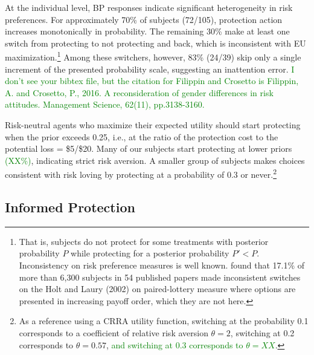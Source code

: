 \documentclass[12pt,a4paper]{article}
\begin{document}
At the individual level, BP responses indicate significant heterogeneity in risk preferences. For approximately 70\% of subjects (72/105), protection action increases monotonically in probability. The remaining 30\% make at least one switch from protecting to not protecting and back, which is inconsistent with EU maximization.\footnote{That is, subjects do not protect for some treatments with posterior probability $P$ while protecting for a posterior probability $P'<P$.  Inconsistency on risk preference measures is well known.  \citet{filippin_and_crosetto} found that 17.1\% of more than 6,300 subjects in 54 published papers made inconsistent switches on the Holt and Laury (2002) on paired-lottery measure where options are presented in increasing payoff order, which they are not here.} Among these switchers, however, 83\% (24/39) skip only a single increment of the presented probability scale, suggesting an inattention error. 
\textcolor{green}{I don't see your bibtex file, but the citation for Filippin and Crosetto is Filippin, A. and Crosetto, P., 2016. A reconsideration of gender differences in risk attitudes. Management Science, 62(11), pp.3138-3160.}


Risk-neutral agents who maximize their expected utility should start protecting when the prior exceeds 0.25, i.e., at the ratio of the protection cost to the potential loss = \$5/\$20. Many of our subjects start protecting at lower priors \textcolor{green}{(XX\%)}, indicating strict risk aversion.  A smaller group of subjects makes choices consistent with risk loving by protecting at a probability of 0.3 or never.\footnote{As a reference using a CRRA utility function, switching at the probability 0.1 corresponds to a coefficient of relative risk aversion $\theta=2$, switching at 0.2 corresponds to $\theta=0.57$, \textcolor{green}{and switching at 0.3 corresponds to $\theta=XX$}.} 


\subsection{Informed Protection}
\end{document}
